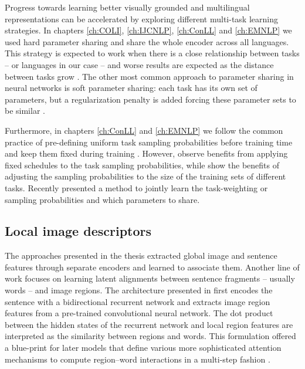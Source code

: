 Progress towards learning better visually grounded and multilingual representations
can be accelerated by exploring different multi-task learning strategies. 
In chapters \ref{ch:COLI}, \ref{ch:IJCNLP}, \ref{ch:ConLL} and \ref{ch:EMNLP}
we used hard parameter sharing \citep{caruana1997multitask,collobert2011natural}
and share the whole encoder across all languages. This strategy is expected to work when there is a close
relationship between tasks \citep{baxter2000model} -- or languages in our case  -- and worse results 
are expected as the distance between tasks grow \citep{maurer2006bounds}. 
The other most common approach to parameter sharing in neural networks is soft parameter sharing:
each task has its
own set of parameters, but a regularization penalty is added forcing these parameter sets to be similar \citep{duong2015low,yang2016trace}.

Furthermore, in chapters \ref{ch:ConLL} and \ref{ch:EMNLP} we follow the common practice of
pre-defining uniform task sampling probabilities 
before training time and keep them fixed during training \citep{alonso2016multitask,Bingel2017}.
However, \cite{kiperwasser2018scheduled} observe benefits from applying fixed schedules to 
the task sampling probabilities, while \cite{sanh2018hierarchical} show the benefits of adjusting the
sampling probabilities to the size of the training sets of different tasks.  Recently \cite{ruder2017sluice}
presented a method to jointly learn the task-weighting or sampling probabilities and which parameters
to share.

\subsection{Local image descriptors}

The approaches presented in the thesis extracted global image and sentence features through separate
encoders and learned to associate them. Another line of work focuses on learning latent alignments
between sentence fragments -- usually words -- and image regions. The architecture presented in 
\citep{karpathy2015deep} first encodes the sentence with a bidirectional recurrent network and extracts
image region features from a pre-trained convolutional neural network. The dot product between 
the hidden states of the recurrent network and local region features are interpreted as the similarity
between regions and words. This formulation offered a blue-print for later models that define various
more sophisticated attention mechanisms to compute region--word interactions in a multi-step fashion
 \citep{nam2017dual,huang2017instance}.


